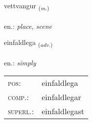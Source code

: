\documentclass[frontgrid, backgrid]{flacards}\usepackage[]{graphicx}\usepackage[]{xcolor}
\begin{document}
\renewcommand{\flhead}{\vskip5pt \fboxsep=0pt {\small\bfseries\footnotesize Nafnorð | Noun}}
\renewcommand{\fcfoot}{\vskip5pt \fboxsep=0pt \hspace{2pt}{\small\bfseries\footnotesize 1K}}

\renewcommand{\blhead}{\vskip5pt {\small\bfseries\footnotesize Nafnorð | Noun }}
\renewcommand{\bcfoot}{\vskip5pt \hspace{2pt}{\small\bfseries\footnotesize 1K}}


{vettvangur \small{\textsubscript{(\textit{m.})}} \\[1ex] %
\textphonetic{[vɛhtvauŋkʏr]} \\
en.: \emph{place, scene} \\  [2ex]
\renewcommand*{\arraystretch}{0.8}
}

\renewcommand{\flhead}{\vskip5pt \fboxsep=0pt {\small\bfseries\footnotesize Atviksorð | Adverb}}
\renewcommand{\fcfoot}{\vskip5pt \fboxsep=0pt \hspace{2pt}{\small\bfseries\footnotesize 1K}}

\renewcommand{\blhead}{\vskip5pt {\small\bfseries\footnotesize Atviksorð | Adverb }}
\renewcommand{\bcfoot}{\vskip5pt \hspace{2pt}{\small\bfseries\footnotesize 1K}}


{einfaldlega \small{\textsubscript{(\textit{adv.})}} \\[1ex] %
\textphonetic{[einfaltlɛɣa]} \\
en.: \emph{simply} \\  [2ex]
\renewcommand*{\arraystretch}{0.8}
\begin{tabular}{ll}
\textsc{pos}: & einfaldlega \\ 
\textsc{comp.}: & einfaldlegar \\ 
\textsc{superl.}: & einfaldlegast \\
\end{tabular}
}
\end{document}
